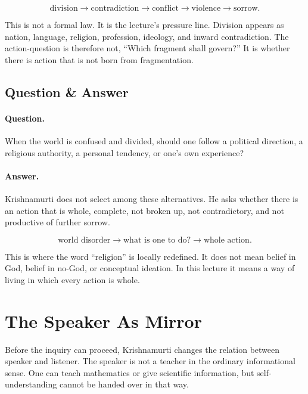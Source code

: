 \documentclass[11pt,oneside]{book}
\begin{document}
\begin{equation}
\text{division}
\longrightarrow
\text{contradiction}
\longrightarrow
\text{conflict}
\longrightarrow
\text{violence}
\longrightarrow
\text{sorrow}.
\end{equation}

This is not a formal law. It is the lecture's pressure line. Division appears as nation, language, religion, profession, ideology, and inward contradiction. The action-question is therefore not, ``Which fragment shall govern?'' It is whether there is action that is not born from fragmentation.

\subsection{Question \& Answer}

\paragraph{Question.}
When the world is confused and divided, should one follow a political direction, a religious authority, a personal tendency, or one's own experience?

\paragraph{Answer.}
Krishnamurti does not select among these alternatives. He asks whether there is an action that is whole, complete, not broken up, not contradictory, and not productive of further sorrow.

\begin{equation}
\text{world disorder}
\longrightarrow
\text{what is one to do?}
\longrightarrow
\text{whole action}.
\end{equation}

This is where the word ``religion'' is locally redefined. It does not mean belief in God, belief in no-God, or conceptual ideation. In this lecture it means a way of living in which every action is whole.

\section{The Speaker As Mirror}

Before the inquiry can proceed, Krishnamurti changes the relation between speaker and listener. The speaker is not a teacher in the ordinary informational sense. One can teach mathematics or give scientific information, but self-understanding cannot be handed over in that way.
\end{document}
